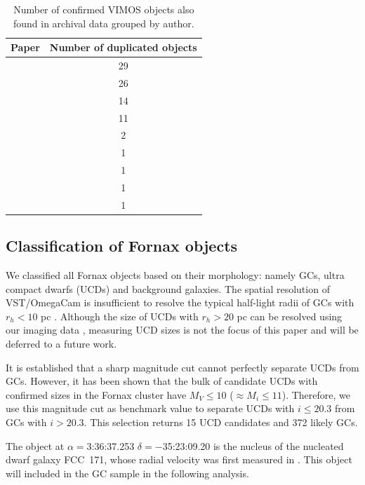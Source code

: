 \documentclass[useAMS,usenatbib]{mn2e}
\newcommand{\kms}{\mbox{\,km~s$^{-1}$}}
\begin{document}
\begin{table}
\centering
\label{mathmode}
\begin{tabular}{@{}l c}
\hline
Paper & Number of duplicated objects \\
\hline
\citet{Dirsch04}       &  29 \\
\citet{Schuberth}      &  26 \\
\citet{Bergond07}      &  14 \\
\citet{Firth07}        &  11 \\
\citet{Chilingarian11} &  2  \\
\citet{Mieske04}       &  1  \\
\citet{Hilker07}       &  1  \\
\citet{Francis12}      &  1  \\
\citet{Drinkwater00}   &  1  \\
\hline
\end{tabular}
\caption{Number of confirmed VIMOS objects also found in archival data grouped 
by author.}
\label{tab:authors} 
\end{table}

\subsection{Classification of Fornax objects}

We classified all Fornax objects based on their morphology: namely GCs, ultra 
compact dwarfs (UCDs) and background galaxies. The spatial resolution of 
VST/OmegaCam is insufficient to resolve the typical half-light radii of GCs 
with $r_h < 10$ pc \citep{Masters, Puzia11}. Although the size of UCDs with 
$r_h > 20$ pc can be resolved using our imaging data \citep{Cantiello15}, 
measuring UCD sizes is not the focus of this paper and will be deferred to a 
future work.

It is established that a sharp magnitude cut cannot perfectly separate UCDs 
from GCs. However, it has been shown \citep{Voggel16, 
Eigenthaler18} that the bulk of candidate UCDs with confirmed sizes in the Fornax cluster 
have $M_V \le 10$ ($\approx M_i \le 11$). 
Therefore, we use this magnitude cut as benchmark value to separate UCDs with 
$i \le 20.3$ from GCs with $i > 20.3$. This selection returns 15 UCD candidates 
and 372 likely GCs. 

The object at $\alpha=$3:36:37.253 $\delta=-$35:23:09.20 is the nucleus of the 
nucleated dwarf galaxy FCC~171, whose radial velocity was first measured in 
\citet{Bergond07}. This object will included in the GC sample in the following 
analysis.  
\end{document}
